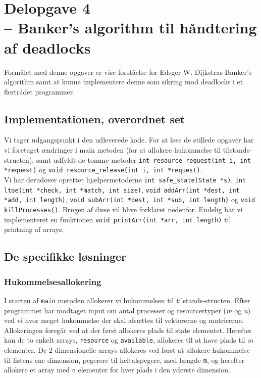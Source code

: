 \documentclass[main.tex]{subfile}
\begin{document}
\section{Delopgave 4\\\normalsize{-- Banker's algorithm til håndtering af deadlocks}}
Formålet med denne opgaver er vise forståelse for Edsger W. Dijkstras Banker’s algorithm samt at kunne implementere denne som sikring mod deadlocks i et flertrådet programmer.

\subsection{Implementationen, overordnet set}
Vi tager udgangspunkt i den udleverede kode. For at løse de stillede opgaver har vi foretaget ændringer i main metoden (for at allokere hukommelse til tilstands-structen), samt udfyldt de tomme metoder \texttt{int resource\_request(int i, int *request)} og \texttt{void resource\_release(int i, int *request)}.\\

Vi har derudover oprettet hjælpermetoderne \texttt{int safe\_state(State *s)}, \texttt{int ltoe(int *check, int *match, int size)}, \texttt{void addArr(int *dest, int *add, int length)}, \texttt{void subArr(int *dest, int *sub, int length)} og \texttt{void killProcesses()}. Brugen af disse vil blive forklaret nedenfor. Endelig har vi implementeret en funktionen \texttt{void printArr(int *arr, int length)} til printning af arrays.

\subsection{De specifikke løsninger}

\subsubsection{Hukommelsesallokering}
I starten af \texttt{main} metoden allokerer vi hukommelsen til tilstands-structen. Efter programmet har modtaget input om antal processer og resourcertyper (\textit{m} og \textit{n}) ved vi hvor meget hukommelse der skal afsættes til vektorerne og matricerne. Allokeringen foregår ved at der først allokeres plads til state elementet. Herefter kan de to enkelt arrays, \texttt{resource} og \texttt{available}, allokeres til at have plads til \emph{m} elementer. De 2-dimensionelle arrays allokeres ved først at allokere hukommelse til listens ene dimension, pegerere til heltalspegere, med længde \texttt{m}, og herefter allokere et array med \texttt{n} elementer for hver plads i den yderste dimension.
\end{document}
